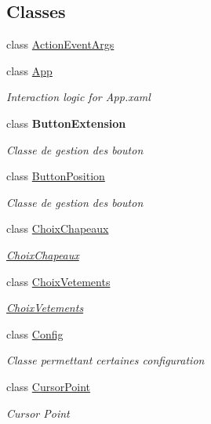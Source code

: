 \subsection*{Classes}
\begin{DoxyCompactItemize}
\item 
class \hyperlink{class_w_p_f_page_switch_1_1_action_event_args}{Action\+Event\+Args}
\item 
class \hyperlink{class_w_p_f_page_switch_1_1_app}{App}
\begin{DoxyCompactList}\small\item\em Interaction logic for App.\+xaml \end{DoxyCompactList}\item 
class {\bfseries Button\+Extension}
\begin{DoxyCompactList}\small\item\em Classe de gestion des bouton \end{DoxyCompactList}\item 
class \hyperlink{class_w_p_f_page_switch_1_1_button_position}{Button\+Position}
\begin{DoxyCompactList}\small\item\em Classe de gestion des bouton \end{DoxyCompactList}\item 
class \hyperlink{class_w_p_f_page_switch_1_1_choix_chapeaux}{Choix\+Chapeaux}
\begin{DoxyCompactList}\small\item\em \hyperlink{class_w_p_f_page_switch_1_1_choix_chapeaux}{Choix\+Chapeaux} \end{DoxyCompactList}\item 
class \hyperlink{class_w_p_f_page_switch_1_1_choix_vetements}{Choix\+Vetements}
\begin{DoxyCompactList}\small\item\em \hyperlink{class_w_p_f_page_switch_1_1_choix_vetements}{Choix\+Vetements} \end{DoxyCompactList}\item 
class \hyperlink{class_w_p_f_page_switch_1_1_config}{Config}
\begin{DoxyCompactList}\small\item\em Classe permettant certaines configuration \end{DoxyCompactList}\item 
class \hyperlink{class_w_p_f_page_switch_1_1_cursor_point}{Cursor\+Point}
\begin{DoxyCompactList}\small\item\em Cursor Point \end{DoxyCompactList}\item 

\end{DoxyCompactItemize}
